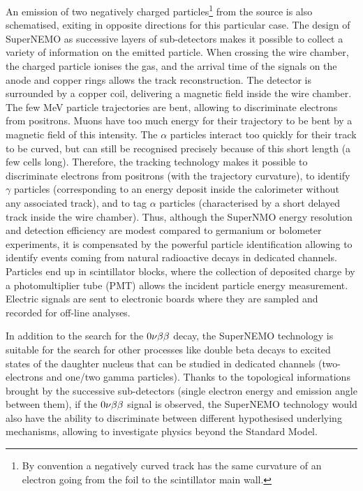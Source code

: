 An emission of two negatively charged particles\footnote{By convention a negatively curved track has the same curvature of an electron going from the foil to the scintillator main wall.} from the source is also schematised, exiting in opposite directions for this particular case.
The design of SuperNEMO as successive layers of sub-detectors makes it possible to collect a variety of information on the emitted particle.
When crossing the wire chamber, the charged particle ionises the gas, and the arrival time of the signals on the anode and copper rings allows the track reconstruction.
The detector is surrounded by a copper coil, delivering a magnetic field inside the wire chamber.
The few MeV particle trajectories are bent, allowing to discriminate electrons from positrons.
Muons have too much energy for their trajectory to be bent by a magnetic field of this intensity.
The $\alpha$ particles interact too quickly for their track to be curved, but can still be recognised precisely because of this short length (a few cells long).
Therefore, the tracking technology makes it possible to discriminate electrons from positrons (with the trajectory curvature), to identify $\gamma$ particles (corresponding to an energy deposit inside the calorimeter without any associated track), and to tag $\alpha$ particles (characterised by a short delayed track inside the wire chamber).
Thus, although the SuperNMO energy resolution and detection efficiency are modest compared to germanium or bolometer experiments, it is compensated by the powerful particle identification allowing to identify events coming from natural radioactive decays in dedicated channels.
Particles end up in scintillator blocks, where the collection of deposited charge by a photomultiplier tube (PMT) allows the incident particle energy measurement.
Electric signals are sent to electronic boards where they are sampled and recorded for off-line analyses.

In addition to the search for the $0\nu\beta\beta$ decay, the SuperNEMO technology is suitable for the search for other processes like double beta decays to excited states of the daughter nucleus that can be studied in dedicated channels (two-electrons and one/two gamma particles).
Thanks to the topological informations brought by the successive sub-detectors (single electron energy and emission angle between them), if the $0\nu\beta\beta$ signal is observed, the SuperNEMO technology would also have the ability to discriminate between different hypothesised underlying mechanisms, allowing to investigate physics beyond the Standard Model.

